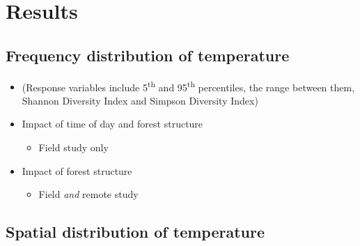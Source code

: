 \documentclass[12pt,a4paper,]{report}
\providecommand{\tightlist}{%
  \setlength{\itemsep}{0pt}\setlength{\parskip}{0pt}}
\theoremstyle{definition}
\theoremstyle{definition}
\theoremstyle{definition}
\theoremstyle{remark}
\begin{document}
\section{Results}\label{results-1}

\subsection{Frequency distribution of
temperature}\label{frequency-distribution-of-temperature}

\begin{itemize}
\tightlist
\item
  (Response variables include 5\textsuperscript{th} and
  95\textsuperscript{th} percentiles, the range between them, Shannon
  Diversity Index and Simpson Diversity Index)
\item
  Impact of time of day and forest structure

  \begin{itemize}
  \tightlist
  \item
    Field study only
  \end{itemize}
\item
  Impact of forest structure

  \begin{itemize}
  \tightlist
  \item
    Field \emph{and} remote study
  \end{itemize}
\end{itemize}

\subsection{Spatial distribution of
temperature}\label{spatial-distribution-of-temperature}
\end{document}
